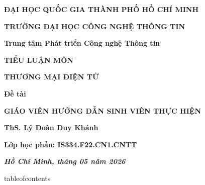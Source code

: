 \documentclass[12pt,a4paper]{article}
\begin{document}
\begin{titlepage}
\centering
\vspace*{1cm}
{\bfseries\Large ĐẠI HỌC QUỐC GIA THÀNH PHỐ HỒ CHÍ MINH\par}
\vspace{0.5cm}
{\bfseries\Large TRƯỜNG ĐẠI HỌC CÔNG NGHỆ THÔNG TIN\par}
\vspace{0.5cm}
{\bfseries Trung tâm Phát triển Công nghệ Thông tin\par}
\vfill
{\bfseries TIỂU LUẬN MÔN\par}
\vspace{0.4cm}
{\bfseries\Large THƯƠNG MẠI ĐIỆN TỬ\par}
\vspace{0.8cm}
{\bfseries\Large Đề tài\par}
\vspace{1.6cm}
{\bfseries GIÁO VIÊN HƯỚNG DẪN SINH VIÊN THỰC HIỆN\par}
\vspace{0.5cm}
{\bfseries ThS. Lý Đoàn Duy Khánh\par}
\vspace{0.4cm}
{\bfseries Lớp học phần: IS334.F22.CN1.CNTT\par}
\vfill
{\bfseries\emph{Hồ Chí Minh, tháng 05 năm 2026}\par}
\end{titlepage}

\clearpage
{}
\setcounter{secnumdepth}{2}
\setcounter{tocdepth}{2}
\renewcommand{\contentsname}{MỤC LỤC}
\csname tableofcontents\endcsname
\clearpage
{}


\end{document}

